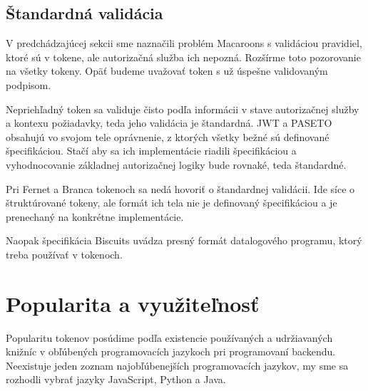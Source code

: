\subsection{Štandardná validácia}

V predchádzajúcej sekcii sme naznačili problém Macaroons s validáciou pravidiel, ktoré sú v tokene, ale autorizačná služba ich nepozná. Rozšírme toto pozorovanie na všetky tokeny. Opäť budeme uvažovať token s už úspešne validovaným podpisom.

Nepriehľadný token sa validuje čisto podľa informácii v stave autorizačnej služby a kontexu požiadavky, teda jeho validácia je štandardná. JWT a PASETO obsahujú vo svojom tele oprávnenie, z ktorých všetky bežné sú definované špecifikáciou. Stačí aby sa ich implementácie riadili špecifikáciou a vyhodnocovanie základnej autorizačnej logiky bude rovnaké, teda štandardné.

Pri Fernet a Branca tokenoch sa nedá hovoriť o štandardnej validácii. Ide síce o štruktúrované tokeny, ale formát ich tela nie je definovaný špecifikáciou a je prenechaný na konkrétne implementácie.

Naopak špecifikácia Biscuits uvádza presný formát datalogového programu, ktorý treba používať v tokenoch.

\section{Popularita a využiteľnosť}

Popularitu tokenov posúdime podľa existencie používaných a udržiavaných knižníc v obľúbených programovacích jazykoch pri programovaní backendu. Neexistuje jeden zoznam najobľúbenejších programovacích jazykov, my sme sa rozhodli vybrať jazyky JavaScript, Python a Java.

